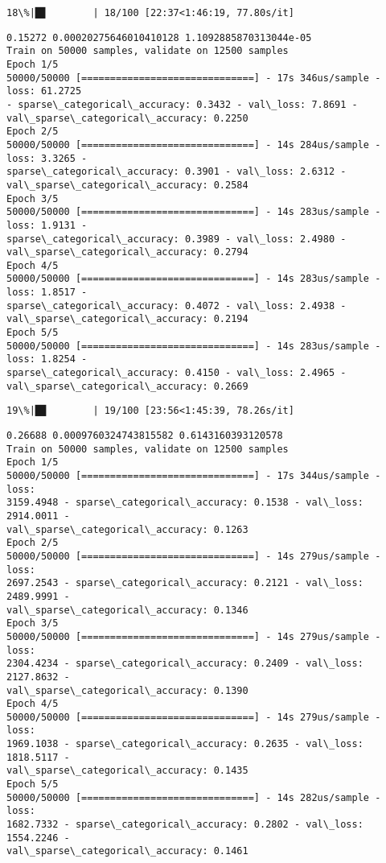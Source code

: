 \documentclass[11pt]{article}
\begin{document}
    \begin{Verbatim}[commandchars=\\\{\}]
 18\%|█▊        | 18/100 [22:37<1:46:19, 77.80s/it]
    \end{Verbatim}

    \begin{Verbatim}[commandchars=\\\{\}]
0.15272 0.00020275646010410128 1.1092885870313044e-05
Train on 50000 samples, validate on 12500 samples
Epoch 1/5
50000/50000 [==============================] - 17s 346us/sample - loss: 61.2725
- sparse\_categorical\_accuracy: 0.3432 - val\_loss: 7.8691 -
val\_sparse\_categorical\_accuracy: 0.2250
Epoch 2/5
50000/50000 [==============================] - 14s 284us/sample - loss: 3.3265 -
sparse\_categorical\_accuracy: 0.3901 - val\_loss: 2.6312 -
val\_sparse\_categorical\_accuracy: 0.2584
Epoch 3/5
50000/50000 [==============================] - 14s 283us/sample - loss: 1.9131 -
sparse\_categorical\_accuracy: 0.3989 - val\_loss: 2.4980 -
val\_sparse\_categorical\_accuracy: 0.2794
Epoch 4/5
50000/50000 [==============================] - 14s 283us/sample - loss: 1.8517 -
sparse\_categorical\_accuracy: 0.4072 - val\_loss: 2.4938 -
val\_sparse\_categorical\_accuracy: 0.2194
Epoch 5/5
50000/50000 [==============================] - 14s 283us/sample - loss: 1.8254 -
sparse\_categorical\_accuracy: 0.4150 - val\_loss: 2.4965 -
val\_sparse\_categorical\_accuracy: 0.2669
    \end{Verbatim}

    \begin{Verbatim}[commandchars=\\\{\}]
 19\%|█▉        | 19/100 [23:56<1:45:39, 78.26s/it]
    \end{Verbatim}

    \begin{Verbatim}[commandchars=\\\{\}]
0.26688 0.0009760324743815582 0.6143160393120578
Train on 50000 samples, validate on 12500 samples
Epoch 1/5
50000/50000 [==============================] - 17s 344us/sample - loss:
3159.4948 - sparse\_categorical\_accuracy: 0.1538 - val\_loss: 2914.0011 -
val\_sparse\_categorical\_accuracy: 0.1263
Epoch 2/5
50000/50000 [==============================] - 14s 279us/sample - loss:
2697.2543 - sparse\_categorical\_accuracy: 0.2121 - val\_loss: 2489.9991 -
val\_sparse\_categorical\_accuracy: 0.1346
Epoch 3/5
50000/50000 [==============================] - 14s 279us/sample - loss:
2304.4234 - sparse\_categorical\_accuracy: 0.2409 - val\_loss: 2127.8632 -
val\_sparse\_categorical\_accuracy: 0.1390
Epoch 4/5
50000/50000 [==============================] - 14s 279us/sample - loss:
1969.1038 - sparse\_categorical\_accuracy: 0.2635 - val\_loss: 1818.5117 -
val\_sparse\_categorical\_accuracy: 0.1435
Epoch 5/5
50000/50000 [==============================] - 14s 282us/sample - loss:
1682.7332 - sparse\_categorical\_accuracy: 0.2802 - val\_loss: 1554.2246 -
val\_sparse\_categorical\_accuracy: 0.1461
    \end{Verbatim}
\end{document}
